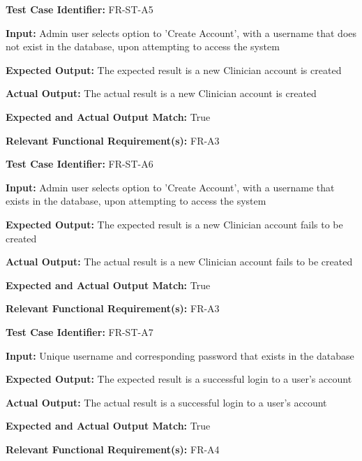 \documentclass[12pt, titlepage]{article}
\begin{document}
\begin{mdframed}[linewidth=0.5mm] \par
  \textbf{Test Case Identifier:} FR-ST-A5 \par
  \textbf{Input:} Admin user selects option to ’Create Account’, with a username that does
  not exist in the database, upon attempting to access the system \par
  \textbf{Expected Output:} The expected result is a new Clinician account is created \par
  \textbf{Actual Output:} The actual result is a new Clinician account is created \par
  \textbf{Expected and Actual Output Match:} True \par
  \textbf{Relevant Functional Requirement(s):} FR-A3
\end{mdframed}

\begin{mdframed}[linewidth=0.5mm] \par
  \textbf{Test Case Identifier:} FR-ST-A6 \par
  \textbf{Input:} Admin user selects option to ’Create Account’, with a username that exists
  in the database, upon attempting to access the system \par
  \textbf{Expected Output:} The expected result is a new Clinician account fails to be created \par
  \textbf{Actual Output:} The actual result is a new Clinician account fails to be created \par
  \textbf{Expected and Actual Output Match:} True \par
  \textbf{Relevant Functional Requirement(s):} FR-A3
\end{mdframed}

\begin{mdframed}[linewidth=0.5mm] \par
  \textbf{Test Case Identifier:} FR-ST-A7 \par
  \textbf{Input:} Unique username and corresponding password that exists in the database \par
  \textbf{Expected Output:} The expected result is a successful login to a user’s account \par
  \textbf{Actual Output:} The actual result is a successful login to a user’s account \par
  \textbf{Expected and Actual Output Match:} True \par
  \textbf{Relevant Functional Requirement(s):} FR-A4
\end{mdframed}
\end{document}
